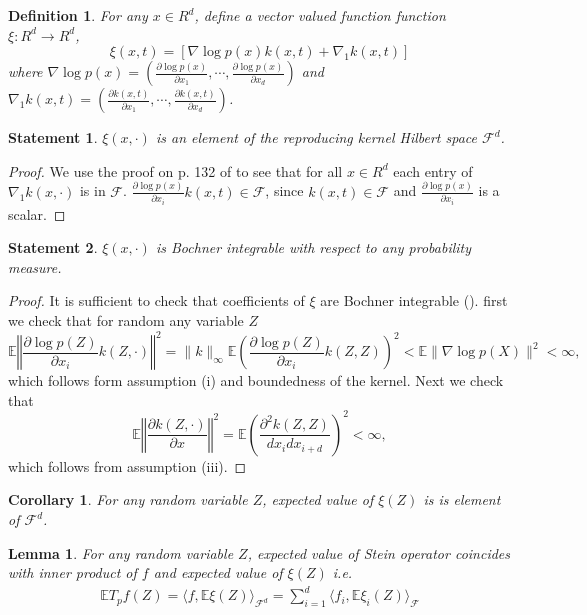 \documentclass{article}
\newtheorem{definition}{Definition}
\newtheorem{lemma}{Lemma}
\newtheorem{statement}{Statement}
\newtheorem{corollary}{Corollary}
\newcommand{\ev}{\mathbb{E}}
\begin{document}
\begin{definition}
For any $x \in R^d$, define a vector valued function function  $\xi: R^d \to R^d$,
\[
 \xi(x,t) =\left[ \nabla \log p(x) k(x,t)+\nabla_1 k(x,t)\right]
\] 
where $\nabla \log p(x) = \left( \frac{\partial \log p(x)}{ \partial x_1}, \cdots , \frac{\partial \log p(x)}{ \partial x_d} \right)$ and 
$  \nabla_1 k(x,t) = \left( \frac{\partial k(x,t)}{ \partial x_1}, \cdots , \frac{\partial  k(x,t)}{ \partial x_d} \right)$. 
\end{definition}

\begin{statement}
\label{lem:WellDefined}
 $\xi(x,\cdot)$ is an element of the reproducing kernel Hilbert space $\mathcal{F}^d$.
\end{statement}
\begin{proof}
 We use the proof on p. 132 of \cite[Corollary 4.36]{SteChr08} to see that for all $x \in R^d$ each entry of $\nabla_1 k(x,\cdot)$ is in $\mathcal{F}$. $\frac{\partial \log p(x)}{ \partial x_i} k(x,t) \in \mathcal{F}$, since $k(x,t) \in\mathcal{F}$ and $\frac{\partial \log p(x)}{ \partial x_i}$ is a scalar. 
\end{proof}


\begin{statement}
\label{lem:BochnerInt}
$\xi(x,\cdot)$ is Bochner integrable with respect to any probability measure.
\end{statement}

\begin{proof}
It is sufficient to check that coefficients of $\xi$ are Bochner integrable  (\cite[Definition A.5.20]{SteChr08}). first we check that for random any variable $Z$
\[
\ev \left\Vert \frac{\partial \log p(Z) }{\partial x_i} k(Z,\cdot)\right\Vert^2 = \| k \|_{\infty}\ev \left( \frac{\partial \log p(Z) }{\partial x_i} k(Z,Z) \right)^2 <\ev   \| \nabla \log p(X) \|^2 <\infty,
\]
which follows form assumption (i) and boundedness of the kernel. Next we check that 
\[
\ev \left\Vert \frac{\partial k(Z,\cdot)}{\partial x}\right\Vert^2 =\ev \left(\frac{\partial^{2} k(Z,Z) }{dx_i dx_{i+d} }\right)^2<\infty,
\]
which follows from assumption (iii). 
\end{proof}

\begin{corollary}
 For any random variable $Z$, expected value of $\xi(Z)$ is is element of $\mathcal{F}^d$.
\end{corollary}


\begin{lemma}
\label{lem:inner}
For any random variable $Z$, expected value of Stein operator coincides with inner product of $f$ and expected value of $\xi(Z)$ i.e. 
\begin{align}
\ev T_{p} f(Z) = \langle f ,\ev \xi(Z) \rangle_{\mathcal{F}^d}  =\sum_{i=1}^d \langle f_i, \ev \xi_i(Z) \rangle_{\mathcal{F}}
\end{align}
\end{lemma}
\end{document}
